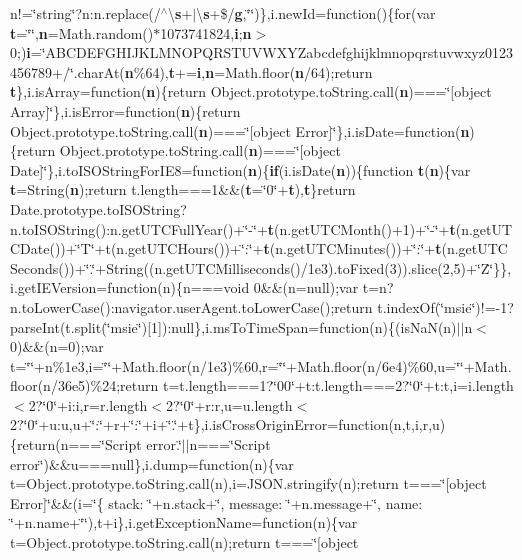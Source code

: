 n!=\char`\"{}string\char`\"{}?n\+:n.\+replace(/$^\wedge$\textbackslash{}{\bf s}+$\vert$\textbackslash{}{\bf s}+\$/{\bf g},\char`\"{}\char`\"{})\},i.\+new\+Id=function()\{for(var {\bf t}=\char`\"{}\char`\"{},{\bf n}=Math.\+random()$\ast$1073741824,{\bf i};{\bf n}$>$0;){\bf i}=\char`\"{}A\+B\+C\+D\+E\+F\+G\+H\+I\+J\+K\+L\+M\+N\+O\+P\+Q\+R\+S\+T\+U\+V\+W\+X\+Y\+Zabcdefghijklmnopqrstuvwxyz0123456789+/\char`\"{}.char\+At({\bf n}\%64),{\bf t}+={\bf i},{\bf n}=Math.\+floor({\bf n}/64);return {\bf t}\},i.\+is\+Array=function({\bf n})\{return Object.\+prototype.\+to\+String.\+call({\bf n})===\char`\"{}\mbox{[}object Array\mbox{]}\char`\"{}\},i.\+is\+Error=function({\bf n})\{return Object.\+prototype.\+to\+String.\+call({\bf n})===\char`\"{}\mbox{[}object Error\mbox{]}\char`\"{}\},i.\+is\+Date=function({\bf n})\{return Object.\+prototype.\+to\+String.\+call({\bf n})===\char`\"{}\mbox{[}object Date\mbox{]}\char`\"{}\},i.\+to\+I\+S\+O\+String\+For\+I\+E8=function({\bf n})\{{\bf if}(i.\+is\+Date({\bf n}))\{function {\bf t}({\bf n})\{var {\bf t}=String({\bf n});return t.\+length===1\&\&({\bf t}=\char`\"{}0\char`\"{}+{\bf t}),{\bf t}\}return Date.\+prototype.\+to\+I\+S\+O\+String?n.\+to\+I\+S\+O\+String()\+:n.\+get\+U\+T\+C\+Full\+Year()+\char`\"{}-\/\char`\"{}+{\bf t}(n.\+get\+U\+T\+C\+Month()+1)+\char`\"{}-\/\char`\"{}+{\bf t}(n.\+get\+U\+T\+C\+Date())+\char`\"{}T\char`\"{}+t(n.\+get\+U\+T\+C\+Hours())+\char`\"{}\+:\char`\"{}+{\bf t}(n.\+get\+U\+T\+C\+Minutes())+\char`\"{}\+:\char`\"{}+{\bf t}(n.\+get\+U\+T\+C\+Seconds())+\char`\"{}.\char`\"{}+String((n.\+get\+U\+T\+C\+Milliseconds()/1e3).\+to\+Fixed(3)).\+slice(2,5)+\char`\"{}\+Z\char`\"{}\}\},i.\+get\+I\+E\+Version=function(n)\{n===void 0\&\&(n=null);var t=n?n.\+to\+Lower\+Case()\+:navigator.\+user\+Agent.\+to\+Lower\+Case();return t.\+index\+Of(\char`\"{}msie\char`\"{})!=-\/1?parse\+Int(t.\+split(\char`\"{}msie\char`\"{})\mbox{[}1\mbox{]})\+:null\},i.\+ms\+To\+Time\+Span=function(n)\{(is\+Na\+N(n)$\vert$$\vert$n$<$0)\&\&(n=0);var t=\char`\"{}\char`\"{}+n\%1e3,i=\char`\"{}\char`\"{}+\+Math.\+floor(n/1e3)\%60,r=\char`\"{}\char`\"{}+\+Math.\+floor(n/6e4)\%60,u=\char`\"{}\char`\"{}+\+Math.\+floor(n/36e5)\%24;return t=t.\+length===1?\char`\"{}00\char`\"{}+t\+:t.\+length===2?\char`\"{}0\char`\"{}+t\+:t,i=i.\+length$<$2?\char`\"{}0\char`\"{}+i\+:i,r=r.\+length$<$2?\char`\"{}0\char`\"{}+r\+:r,u=u.\+length$<$2?\char`\"{}0\char`\"{}+u\+:u,u+\char`\"{}\+:\char`\"{}+r+\char`\"{}\+:\char`\"{}+i+\char`\"{}.\char`\"{}+t\},i.\+is\+Cross\+Origin\+Error=function(n,t,i,r,u)\{return(n===\char`\"{}\+Script error.\char`\"{}$\vert$$\vert$n===\char`\"{}\+Script error\char`\"{})\&\&u===null\},i.\+dump=function(n)\{var t=\+Object.\+prototype.\+to\+String.\+call(n),i=\+J\+S\+O\+N.\+stringify(n);return t===\char`\"{}\mbox{[}object Error\mbox{]}\char`\"{}\&\&(i=\char`\"{}\{ stack\+: \textquotesingle{}\char`\"{}+n.\+stack+\char`\"{}\textquotesingle{}, message\+: \textquotesingle{}\char`\"{}+n.\+message+\char`\"{}\textquotesingle{}, name\+: \textquotesingle{}\char`\"{}+n.\+name+\char`\"{}\textquotesingle{}\char`\"{}),t+i\},i.\+get\+Exception\+Name=function(n)\{var t=\+Object.\+prototype.\+to\+String.\+call(n);return t===\char`\"{}\mbox{[}object 